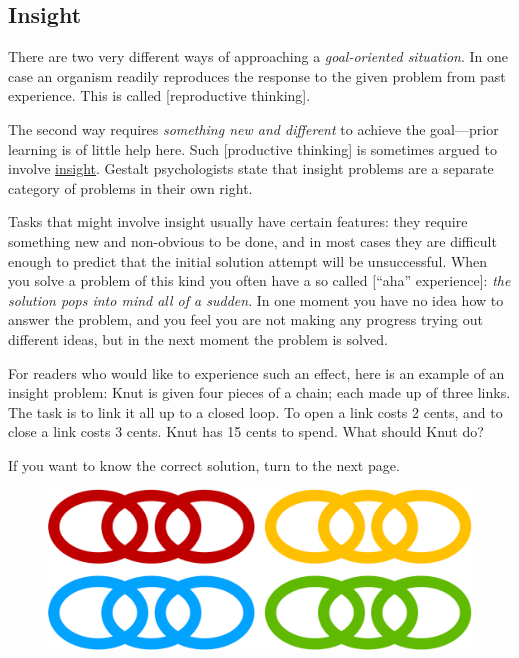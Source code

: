 \documentclass[
]{krantz}
\begin{document}
\hypertarget{insight}{%
\subsection*{Insight}\label{insight}}


There are two very different ways of approaching a \emph{goal-oriented situation}. In one case an organism readily reproduces the response to the given problem from past experience. This is called {[}reproductive thinking{]}.

The second way requires \emph{something new and different} to achieve the goal---prior learning is of little help here. Such {[}productive thinking{]} is sometimes argued to involve \protect\hyperlink{insight}{insight}. Gestalt psychologists state that insight problems are a separate category of problems in their own right.

Tasks that might involve insight usually have certain features: they require something new and non-obvious to be done, and in most cases they are difficult enough to predict that the initial solution attempt will be unsuccessful. When you solve a problem of this kind you often have a so called {[}``aha'' experience{]}: \emph{the solution pops into mind all of a sudden}. In one moment you have no idea how to answer the problem, and you feel you are not making any progress trying out different ideas, but in the next moment the problem is solved.

For readers who would like to experience such an effect, here is an example of an insight problem: Knut is given four pieces of a chain; each made up of three links. The task is to link it all up to a closed loop. To open a link costs 2 cents, and to close a link costs 3 cents. Knut has 15 cents to spend. What should Knut do?

If you want to know the correct solution, turn to the next page.

\begin{figure}

{\centering \includegraphics[width=0.6\linewidth]{images/ch10/fig1} 

}

\end{figure}
\end{document}
